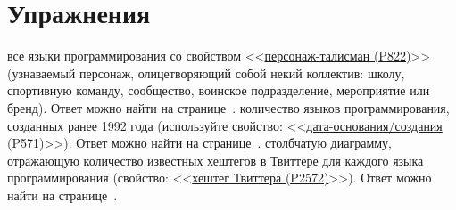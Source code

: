 \section{Упражнения}
\label{prog_lang_test}
\begin{enumerate}
	 все языки программирования со свойством <<\href{https://www.wikidata.org/wiki/Property:P822}{персонаж-талисман (P822)}>> (узнаваемый персонаж, олицетворяющий собой некий коллектив: школу, спортивную команду, сообщество, воинское подразделение, мероприятие или бренд).
Ответ можно найти на странице~\pageref{answer:prog_langs_4}.
	 количество языков программирования, созданных ранее 1992 года (используйте свойство: <<\href{https://www.wikidata.org/wiki/Property:P571}{дата-основания/создания (P571)}>>).
Ответ можно найти на странице~\pageref{answer:prog_langs_4}.
	 столбчатую диаграмму, отражающую количество известных хештегов в Твиттере для каждого языка программирования (свойство: <<\href{https://www.wikidata.org/wiki/Property:P2572}{хештег Твиттера (P2572)}>>).
Ответ можно найти на странице~\pageref{answer:prog_langs_4}.
\end{enumerate}

